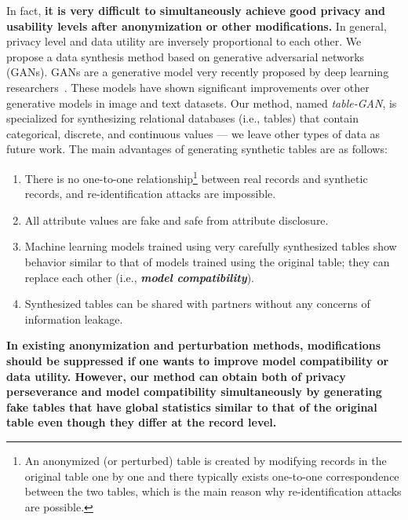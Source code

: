 In fact, \textbf{it is very difficult to simultaneously achieve good privacy and usability levels after anonymization or other  modifications.} In general, privacy level and data utility are inversely proportional to each other. 
We propose a data synthesis method based on generative adversarial networks (GANs). GANs are a generative model very recently proposed by deep learning researchers~\cite{goodfellow2014generative}. These models have shown significant improvements over other generative models in image and text datasets. Our method, named \textit{table-GAN},  is specialized for synthesizing relational databases (i.e., tables) that contain categorical, discrete, and continuous values --- we leave other types of data as future work. The main advantages of generating synthetic tables are as follows:
\begin{enumerate}
\item There is no one-to-one relationship\footnote{An anonymized (or perturbed) table is created by modifying records in the original table one by one and there typically exists one-to-one correspondence between the two tables, which is the main reason why re-identification attacks are possible.} between real records and synthetic records, and re-identification attacks are impossible.
\item All attribute values are fake and safe from attribute disclosure.
\item Machine learning models trained using very carefully synthesized tables show behavior similar to that of models trained using the original table; they can replace each other (i.e., \textbf{\textit{model compatibility}}).
\item Synthesized tables can be shared with partners without any concerns of information leakage.
\end{enumerate}


\textbf{In existing anonymization and perturbation methods, modifications should be suppressed if one wants to improve model compatibility or data utility. However, our method can obtain both of privacy perseverance and model compatibility simultaneously by generating fake tables that have global statistics similar to that of the original table even though they differ at the record level.}

